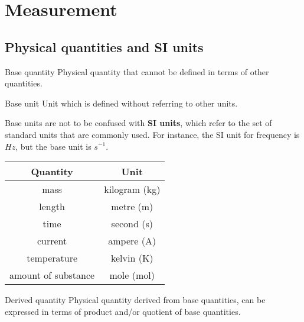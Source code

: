 \section{Measurement}
\subsection{Physical quantities and SI units}
\begin{defn}{Base quantity}{}
Physical quantity that cannot be defined in terms of other quantities.
\end{defn}

\begin{defn}{Base unit}{}
Unit which is defined without referring to other units.
\end{defn}
\begin{remark}
Base units are not to be confused with \textbf{SI units}, which refer to the set of standard units that are commonly used. For instance, the SI unit for frequency is $\unit{Hz}$, but the base unit is $\unit{s^{-1}}$.
\end{remark}

\begin{table}[H]
	\centering
	\begin{tabular}{cc} 
	\hline\hline
	\textbf{Quantity} & \textbf{Unit} \\ 
	\hline
	mass & kilogram (kg) \\
	length & metre (m) \\
	time & second (s) \\
	current & ampere (A) \\
	temperature & kelvin (K) \\
	amount of substance & mole (mol) \\
	\hline\hline
	\end{tabular}
\end{table}

\begin{defn}{Derived quantity}{}
Physical quantity derived from base quantities, can be expressed in terms of product and/or quotient of base quantities.
\end{defn}

